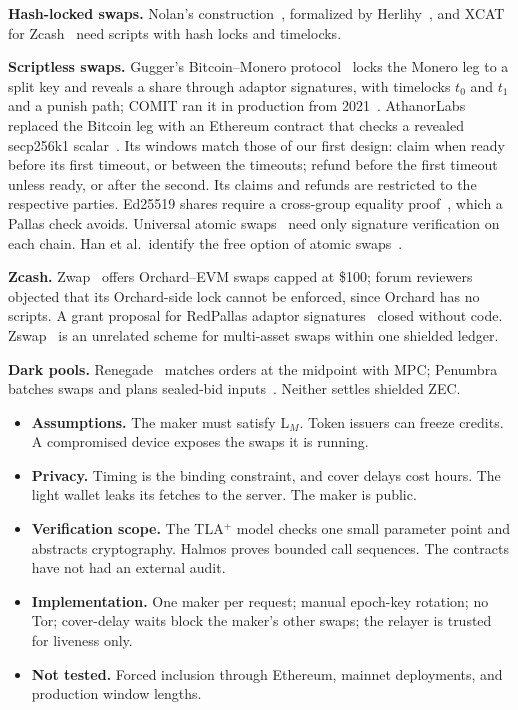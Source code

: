 \documentclass[10pt,letterpaper]{article}
\makeatletter
\renewcommand\section{\@startsection{section}{1}{\z@}{-1.3em}{0.45em}{\normalfont\large\bfseries}}
\theoremstyle{plain}
\theoremstyle{definition}
\makeatother
\begin{document}
\textbf{Hash-locked swaps.} Nolan's construction~\cite{nolan}, formalized by
Herlihy~\cite{herlihy}, and XCAT for Zcash~\cite{xcat} need scripts with hash locks and timelocks.

\textbf{Scriptless swaps.} Gugger's Bitcoin--Monero protocol~\cite{gugger} locks the Monero leg to
a split key and reveals a share through adaptor signatures, with timelocks $t_0$ and $t_1$ and a
punish path; COMIT ran it in production from 2021~\cite{comit}. AthanorLabs replaced the Bitcoin
leg with an Ethereum contract that checks a revealed secp256k1 scalar~\cite{athanor}. Its windows
match those of our first design: claim when ready before its first timeout, or between the
timeouts; refund before the first timeout unless ready, or after the second. Its claims and
refunds are restricted to the respective parties. Ed25519 shares require a cross-group equality
proof~\cite{mrl10}, which a Pallas check avoids. Universal atomic swaps~\cite{uas} need only
signature verification on each chain. Han et al.\ identify the free option of atomic
swaps~\cite{optionality}.

\textbf{Zcash.} Zwap~\cite{zwap} offers Orchard--EVM swaps capped at \$100; forum reviewers
objected that its Orchard-side lock cannot be enforced, since Orchard has no scripts. A grant
proposal for RedPallas adaptor signatures~\cite{zswap} closed without code. Zswap~\cite{zswappets}
is an unrelated scheme for multi-asset swaps within one shielded ledger.

\textbf{Dark pools.} Renegade~\cite{renegade} matches orders at the midpoint with MPC; Penumbra
batches swaps and plans sealed-bid inputs~\cite{penumbra}. Neither settles shielded ZEC.

\section{Limitations}

\begin{itemize}\setlength\itemsep{0.1em}
\item \textbf{Assumptions.} The maker must satisfy L$_M$. Token issuers can freeze credits. A
compromised device exposes the swaps it is running.
\item \textbf{Privacy.} Timing is the binding constraint, and cover delays cost hours. The light
wallet leaks its fetches to the server. The maker is public.
\item \textbf{Verification scope.} The TLA$^+$ model checks one small parameter point and abstracts
cryptography. Halmos proves bounded call sequences. The contracts have not had an external audit.
\item \textbf{Implementation.} One maker per request; manual epoch-key rotation; no Tor;
cover-delay waits block the maker's other swaps; the relayer is trusted for liveness only.
\item \textbf{Not tested.} Forced inclusion through Ethereum, mainnet deployments, and production
window lengths.
\end{itemize}
\end{document}
